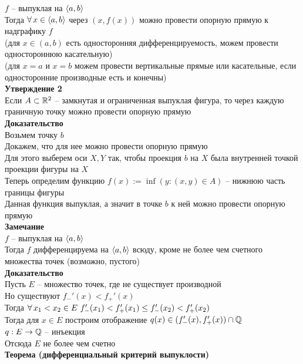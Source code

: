 \documentclass[12pt]{article}
\begin{document}
$f$ -- выпуклая на $\langle a, b \rangle$\\
Тогда $\forall\, x \in \langle a, b \rangle$ через $(x, f(x))$ можно провести опорную прямую к надграфику $f$\\
(для $x \in (a,b)$ есть односторонняя дифференцируемость, можем провести одностороннюю касательную)\\
(для $x = a$ и $x = b$ можем провести вертикальные прямые или касательные, если односторонние производные есть и конечны)\\
\textbf{Утверждение 2}\\
Если $A \subset \mathbb{R}^2$ -- замкнутая и ограниченная выпуклая фигура, то через каждую граничную точку можно провести опорную прямую\\
\textbf{Доказательство}\\
Возьмем точку $b$\\
Докажем, что для нее можно провести опорную прямую\\
Для этого выберем оси $X, Y$ так, чтобы проекция $b$ на $X$ была внутренней точкой проекции фигуры на $X$\\
Теперь определим функцию $f(x) := \inf (y: (x,y) \in A)$ -- нижнюю часть границы фигуры\\
Данная функция выпуклая, а значит в точке $b$ к ней можно провести опорную прямую\\
\textbf{Замечание}\\
$f$ -- выпуклая на $\langle a, b \rangle$\\
Тогда $f$ дифференцируема на $\langle a, b \rangle$ всюду, кроме не более чем счетного множества точек (возможно, пустого)\\
\textbf{Доказательство}\\
Пусть $E$ -- множество точек, где не существует производной\\
Но существуют $f_-'(x) < f_+'(x)$\\
Тогда $\forall\, x_1 < x_2 \in E\ f_-'(x_1) < f_+'(x_1) \leq f_-'(x_2) < f_+'(x_2)$\\
Тогда для $x \in E$ построим отображение $q(x) \in (f_-'(x), f_+'(x)) \cap \mathbb{Q}$\\
$q: E \rightarrow \mathbb{Q}$ -- инъекция\\
Отсюда $E$ не более чем счетно\\
\textbf{Теорема (дифференциальный критерий выпуклости)}
\end{document}
